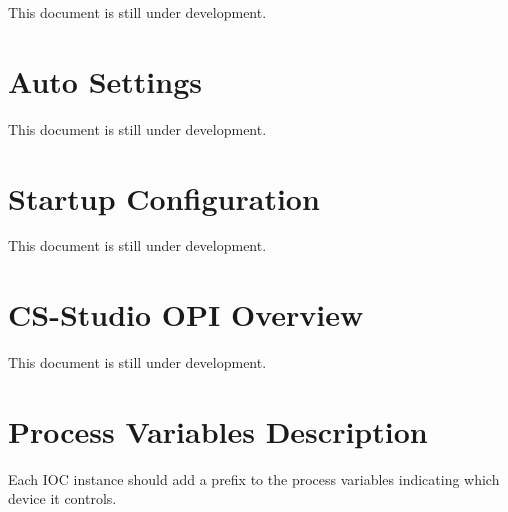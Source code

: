 \documentclass[openany]{article}
\begin{document}
    This document is still under development.

\section{Auto Settings}

    This document is still under development.

\section{Startup Configuration}

    This document is still under development.

\section{CS-Studio OPI Overview}

    This document is still under development.

\newpage
\section{Process Variables Description}\label{sec:process-variables}

    Each IOC instance should add a prefix to the process variables indicating which device it controls.
\end{document}
